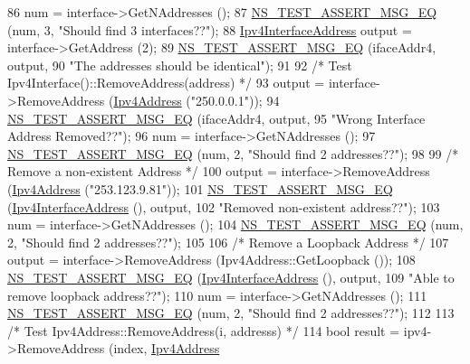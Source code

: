 \begin{DoxyCode}
86   num = interface->GetNAddresses ();
87   \hyperlink{group__testing_ga2a9d78cffb3db8e867c35fff0b698cf5}{NS\_TEST\_ASSERT\_MSG\_EQ} (num, 3, \textcolor{stringliteral}{"Should find 3 interfaces??"});
88   \hyperlink{classns3_1_1Ipv4InterfaceAddress}{Ipv4InterfaceAddress} output = interface->GetAddress (2);
89   \hyperlink{group__testing_ga2a9d78cffb3db8e867c35fff0b698cf5}{NS\_TEST\_ASSERT\_MSG\_EQ} (ifaceAddr4, output,
90                          \textcolor{stringliteral}{"The addresses should be identical"});
91 
92   \textcolor{comment}{/* Test Ipv4Interface()::RemoveAddress(address) */}
93   output = interface->RemoveAddress (\hyperlink{classns3_1_1Ipv4Address}{Ipv4Address} (\textcolor{stringliteral}{"250.0.0.1"}));
94   \hyperlink{group__testing_ga2a9d78cffb3db8e867c35fff0b698cf5}{NS\_TEST\_ASSERT\_MSG\_EQ} (ifaceAddr4, output,
95                          \textcolor{stringliteral}{"Wrong Interface Address Removed??"});
96   num = interface->GetNAddresses ();
97   \hyperlink{group__testing_ga2a9d78cffb3db8e867c35fff0b698cf5}{NS\_TEST\_ASSERT\_MSG\_EQ} (num, 2, \textcolor{stringliteral}{"Should find 2 addresses??"});
98   
99   \textcolor{comment}{/* Remove a non-existent Address */}
100   output = interface->RemoveAddress (\hyperlink{classns3_1_1Ipv4Address}{Ipv4Address} (\textcolor{stringliteral}{"253.123.9.81"}));
101   \hyperlink{group__testing_ga2a9d78cffb3db8e867c35fff0b698cf5}{NS\_TEST\_ASSERT\_MSG\_EQ} (\hyperlink{classns3_1_1Ipv4InterfaceAddress}{Ipv4InterfaceAddress} (), output,
102                          \textcolor{stringliteral}{"Removed non-existent address??"});
103   num = interface->GetNAddresses ();
104   \hyperlink{group__testing_ga2a9d78cffb3db8e867c35fff0b698cf5}{NS\_TEST\_ASSERT\_MSG\_EQ} (num, 2, \textcolor{stringliteral}{"Should find 2 addresses??"});
105   
106   \textcolor{comment}{/* Remove a Loopback Address */}
107   output = interface->RemoveAddress (Ipv4Address::GetLoopback ());
108   \hyperlink{group__testing_ga2a9d78cffb3db8e867c35fff0b698cf5}{NS\_TEST\_ASSERT\_MSG\_EQ} (\hyperlink{classns3_1_1Ipv4InterfaceAddress}{Ipv4InterfaceAddress} (), output,
109                          \textcolor{stringliteral}{"Able to remove loopback address??"});
110   num = interface->GetNAddresses ();
111   \hyperlink{group__testing_ga2a9d78cffb3db8e867c35fff0b698cf5}{NS\_TEST\_ASSERT\_MSG\_EQ} (num, 2, \textcolor{stringliteral}{"Should find 2 addresses??"});
112 
113   \textcolor{comment}{/* Test Ipv4Address::RemoveAddress(i, addresss) */}
114   \textcolor{keywordtype}{bool} result = ipv4->RemoveAddress (index, \hyperlink{classns3_1_1Ipv4Address}{Ipv4Address}

\end{DoxyCode}
